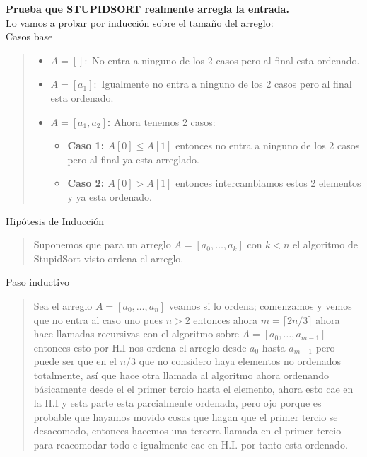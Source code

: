 \textbf{Prueba que STUPIDSORT realmente arregla la entrada.}\\

Lo vamos a probar por inducción sobre el tamaño del arreglo:\\

\textcolor{bibi}{Casos base}
\begin{quote}
    \begin{itemize}
        \item \textbf{$A=[]:$} No entra a ninguno de los 2 casos pero al final esta ordenado.
        \item \textbf{$A=[a_1]:$} Igualmente no entra a ninguno de los 2 casos pero al final esta ordenado.
        \item \textbf{$A=[a_1,a_2]$:} Ahora tenemos 2 casos:\\
        \begin{itemize}
            \item \textbf{Caso 1: $A[0] \leq A[1]$} entonces no entra a ninguno de los 2 casos pero al final ya esta arreglado.
            \item \textbf{Caso 2: $A[0] > A[1]$} entonces intercambiamos estos 2 elementos y ya esta ordenado.\\
        \end{itemize}
    \end{itemize}
\end{quote}

\textcolor{bibi}{Hipótesis de Inducción}
\begin{quote}
    Suponemos que para un arreglo $A=[a_0,\dots,a_k]$ con $k<n$ el algoritmo de StupidSort visto ordena el arreglo.\\
\end{quote}

\textcolor{bibi}{Paso inductivo}
\begin{quote}
    Sea el arreglo $A=[a_0,\dots,a_n]$ veamos si lo ordena; comenzamos y vemos que no entra al caso uno pues $n>2$ entonces ahora $m=\lceil 2n/3 \rceil$ ahora hace llamadas recursivas con el algoritmo sobre $A=[a_0,\dots,a_{m-1}]$ entonces esto por H.I nos ordena el arreglo desde $a_{0}$ hasta $a_{m-1}$ pero puede ser que en el $n/3$ que no considero haya elementos no ordenados totalmente, así que hace otra llamada al algoritmo ahora ordenando básicamente desde el el primer tercio hasta el elemento, ahora esto cae en la H.I y esta parte esta parcialmente ordenada, pero ojo porque es probable que hayamos movido cosas que hagan que el primer tercio se desacomodo, entonces hacemos una tercera llamada en el primer tercio para reacomodar todo e igualmente cae en H.I. por tanto esta ordenado.\\
\end{quote}
